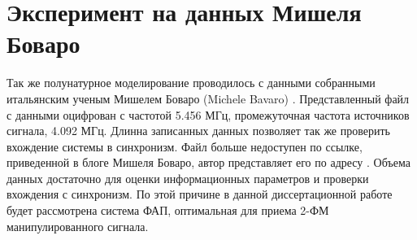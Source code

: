 %
%
%


\section{Эксперимент на данных Мишеля Боваро}

Так же полунатурное моделирование проводилось с данными собранными итальянским ученым Мишелем Боваро (Michele Bavaro) \cite{bovaro_blog}. Представленный файл с данными оцифрован
с частотой 5.456 МГц, промежуточная частота источников сигнала, 4.092 МГц. Длинна записанных данных позволяет так же проверить
вхождение системы в синхронизм. Файл больше недоступен по ссылке, приведенной в блоге Мишеля Боваро, автор представляет его по адресу \cite{rflab_primo}.
Объема данных достаточно для оценки информационных параметров и проверки вхождения с синхронизм. По этой причине в данной диссертационной работе будет
рассмотрена система ФАП, оптимальная для приема 2-ФМ манипулированного сигнала.

